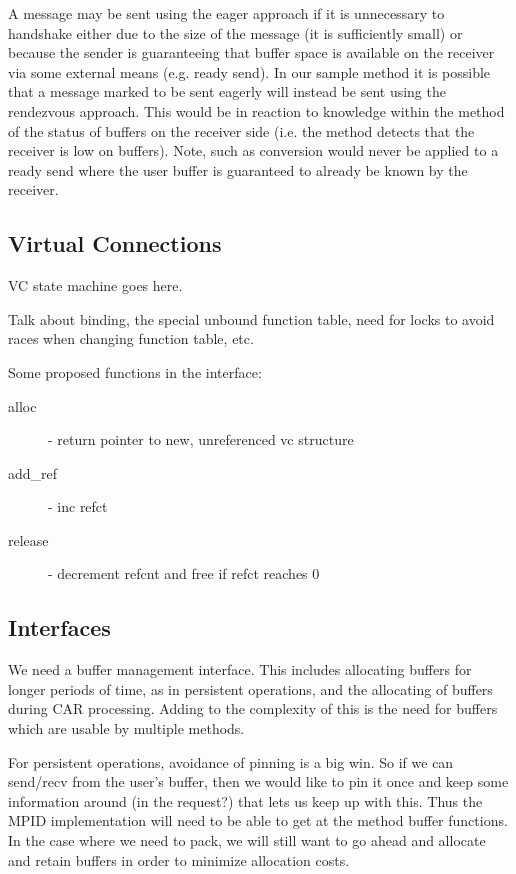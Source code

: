 \documentclass[11pt,letterpaper]{article}
\begin{document}

A message may be sent using the eager approach if it is unnecessary to
handshake either due to the size of the message (it is sufficiently small) or
because the sender is guaranteeing that buffer space is available on the
receiver via some external means (e.g. ready send).  In our sample method it is
possible that a message marked to be sent eagerly will instead be sent using
the rendezvous approach.  This would be in reaction to knowledge within the
method of the status of buffers on the receiver side (i.e. the method detects
that the receiver is low on buffers).  Note, such as conversion would never be
applied to a ready send where the user buffer is guaranteed to already be known
by the receiver.

\subsection{Virtual Connections}

VC state machine goes here.

Talk about binding, the special unbound function table, need for locks to avoid
races when changing function table, etc.

Some proposed functions in the interface:
\begin{description}
\item[alloc] - return pointer to new, unreferenced vc structure
\item[add\_ref] - inc refct
\item[release] - decrement refcnt and free if refct reaches 0
\end{description}





\subsection{Interfaces}

We need a buffer management interface.  This includes allocating buffers for
longer periods of time, as in persistent operations, and the allocating of
buffers during CAR processing.  Adding to the complexity of this is the need
for buffers which are usable by multiple methods.

For persistent operations, avoidance of pinning is a big win.  So if we can
send/recv from the user's buffer, then we would like to pin it once and keep
some information around (in the request?) that lets us keep up with this.  Thus
the MPID implementation will need to be able to get at the method buffer
functions.  In the case where we need to pack, we will still want to go ahead
and allocate and retain buffers in order to minimize allocation costs.
\end{document}
